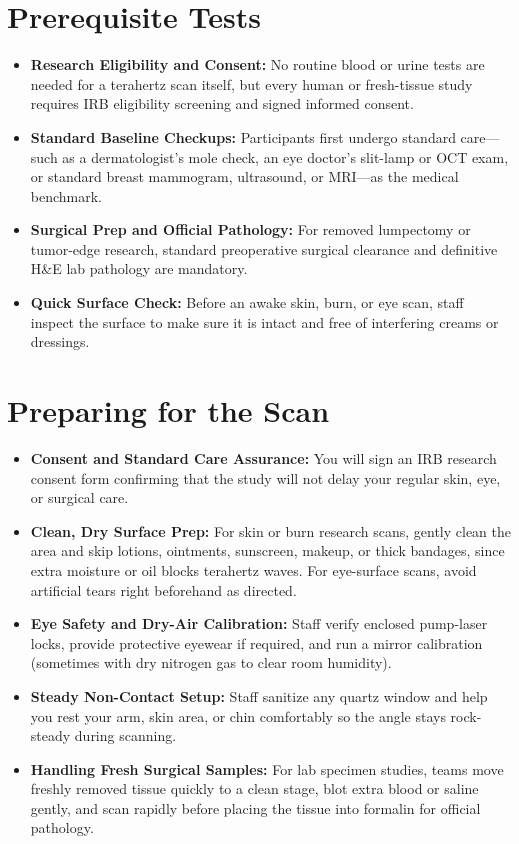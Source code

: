 \section{Prerequisite Tests}
\begin{itemize}
  \item \textbf{Research Eligibility and Consent:} No routine blood or urine tests are needed for a terahertz scan itself, but every human or fresh-tissue study requires IRB eligibility screening and signed informed consent.
  \item \textbf{Standard Baseline Checkups:} Participants first undergo standard care---such as a dermatologist's mole check, an eye doctor's slit-lamp or OCT exam, or standard breast mammogram, ultrasound, or MRI---as the medical benchmark.
  \item \textbf{Surgical Prep and Official Pathology:} For removed lumpectomy or tumor-edge research, standard preoperative surgical clearance and definitive H\&E lab pathology are mandatory.
  \item \textbf{Quick Surface Check:} Before an awake skin, burn, or eye scan, staff inspect the surface to make sure it is intact and free of interfering creams or dressings.
\end{itemize}

\section{Preparing for the Scan}
\begin{itemize}
  \item \textbf{Consent and Standard Care Assurance:} You will sign an IRB research consent form confirming that the study will not delay your regular skin, eye, or surgical care.
  \item \textbf{Clean, Dry Surface Prep:} For skin or burn research scans, gently clean the area and skip lotions, ointments, sunscreen, makeup, or thick bandages, since extra moisture or oil blocks terahertz waves. For eye-surface scans, avoid artificial tears right beforehand as directed.
  \item \textbf{Eye Safety and Dry-Air Calibration:} Staff verify enclosed pump-laser locks, provide protective eyewear if required, and run a mirror calibration (sometimes with dry nitrogen gas to clear room humidity).
  \item \textbf{Steady Non-Contact Setup:} Staff sanitize any quartz window and help you rest your arm, skin area, or chin comfortably so the angle stays rock-steady during scanning.
  \item \textbf{Handling Fresh Surgical Samples:} For lab specimen studies, teams move freshly removed tissue quickly to a clean stage, blot extra blood or saline gently, and scan rapidly before placing the tissue into formalin for official pathology.
\end{itemize}

